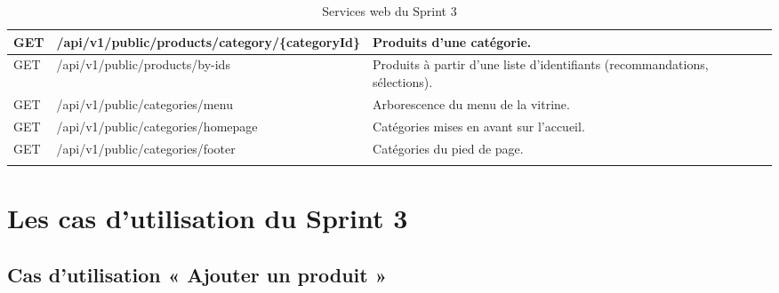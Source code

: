 \begin{longtable}{|p{2.5cm}|p{8.8cm}|p{4.2cm}|}
\hline
GET & /api/v1/public/products/category/\{categoryId\} & Produits d'une catégorie. \\
\hline
GET & /api/v1/public/products/by-ids & Produits à partir d'une liste d'identifiants (recommandations, sélections). \\
\hline
GET & /api/v1/public/categories/menu & Arborescence du menu de la vitrine. \\
\hline
GET & /api/v1/public/categories/homepage & Catégories mises en avant sur l'accueil. \\
\hline
GET & /api/v1/public/categories/footer & Catégories du pied de page. \\
\hline
\caption{Services web du Sprint 3}
\label{tab:ws-sprint3}
\end{longtable}

\section{Les cas d'utilisation du Sprint 3}
\subsection{Cas d'utilisation « Ajouter un produit »}
